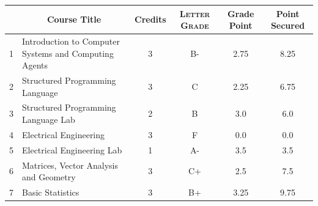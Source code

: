 \documentclass[11pt]{article}
\newcommand*{\numtwo}[1]{\pgfmathprintnumber[
                    fixed, precision=2, fixed zerofill=true]{#1}}
\begin{document}
                \begin{center}
                    \renewcommand{\arraystretch}{1.08}
                    
                \begin{tabular}{|c|l|c|>{\scshape}c|c|c|}
                \hline  \rule[-1ex]{0pt}{3.5ex} {\centering{\bf Course Code}} &  \multicolumn{1}{c|}{\textbf{Course Title}}  & {\bf Credits} & {\bf Letter Grade} & {\bf Grade Point} & {\bf Point Secured}  \\ 
                \hline   1 &  Introduction to Computer Systems and Computing Agents		 & 3 & B- & 2.75 & 8.25 \\ %
                \hline   2 &  Structured Programming Language		 & 3 & C & 2.25 & 6.75 \\ %
                \hline   3 &  Structured Programming Language Lab		 & 2 & B & 3.0 & 6.0 \\ %
                \hline   4 &  Electrical Engineering		 & 3 & F & 0.0 & 0.0 \\ %
                \hline   5 &  Electrical Engineering Lab		 & 1 & A- & 3.5 & 3.5 \\ %
                \hline   6 &  Matrices, Vector Analysis and Geometry		 & 3 & C+ & 2.5 & 7.5 \\ %
                \hline   7 &  Basic Statistics		 & 3 & B+ & 3.25 & 9.75 \\ %

\hline                %
                \end{tabular}
                \end{center}
                \renewcommand{\arraystretch}{1.03}
\end{document}
